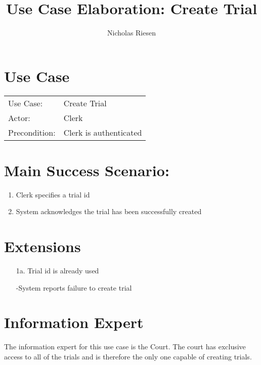 \documentclass{article}
\title{Use Case Elaboration: Create Trial}
\author{Nicholas Riesen}
\begin{document}
\maketitle

\section*{Use Case}
\begin{tabular}{l l}
  Use Case:     &  Create Trial            \\
  Actor:        &  Clerk                   \\
  Precondition: &  Clerk is authenticated  \\
\end{tabular}

\section*{Main Success Scenario:}
\begin{enumerate}
   \item Clerk specifies a trial id
   \item System acknowledges the trial has been successfully created
\end{enumerate}

\section*{Extensions}
\begin{itemize}
  \item [1a.] Trial id is already used
       
       -System reports failure to create trial
\end{itemize}

\section*{Information Expert}
The information expert for this use case is the Court. The court has exclusive access to all of the trials and is therefore the only one capable of creating trials. 
\end{document}
